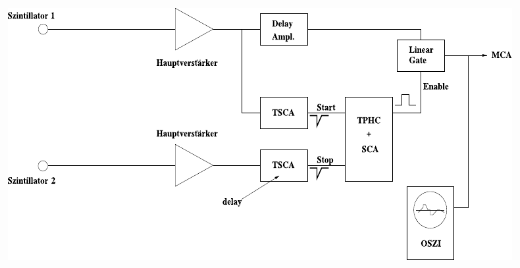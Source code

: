 \begin{multicols}{2}
\begin{center}
\begin{adjustbox}{max width=\linewidth, keepaspectratio}
        \end{adjustbox}
        \label{fig:Schaltung5}
    \end{center}
\endminipage
%
\vspace{10mm}
%
\minipage{\linewidth}
    \begin{center}
        \captionsetup{type=figure}
        \begin{adjustbox}{max width=\linewidth, keepaspectratio}
            \includegraphics[]{pdf/Schaltung6_mod}
        \end{adjustbox}
        \label{fig:Schaltung6}
    \end{center}
\endminipage
%
\newpage
%
\end{multicols}
%
